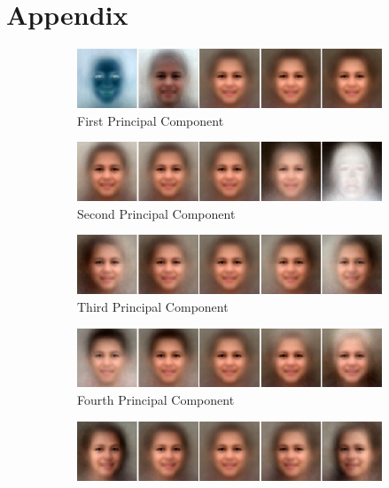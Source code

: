 \newpage
\appendix
\chapter{Appendix}

\begin{figure}
    \centering
    \begin{subfigure}[b]{\textwidth}
        \includegraphics[width=\textwidth]{fig/PCA/pca0}
        \caption{First Principal Component}
    \end{subfigure}
    \begin{subfigure}[b]{\textwidth}
        \includegraphics[width=\textwidth]{fig/PCA/pca1}
        \caption{Second Principal Component}
    \end{subfigure}
    \begin{subfigure}[b]{\textwidth}
        \includegraphics[width=\textwidth]{fig/PCA/pca2}
        \caption{Third Principal Component}
    \end{subfigure}
    \begin{subfigure}[b]{\textwidth}
        \includegraphics[width=\textwidth]{fig/PCA/pca3}
        \caption{Fourth Principal Component}
    \end{subfigure}
    \begin{subfigure}[b]{\textwidth}
        \includegraphics[width=\textwidth]{fig/PCA/pca4}

\end{subfigure}
\end{figure}
